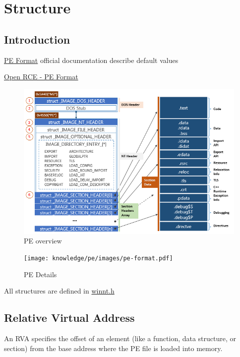 \section{Structure}
\subsection{Introduction}

\href{https://learn.microsoft.com/en-us/windows/win32/debug/pe-format}{PE Format} official documentation describe default values 

\href{https://www.openrce.org/reference_library/files/reference/PE%20Format.pdf}{Open RCE - PE Format}

\begin{figure}[!ht]
    \includegraphics[width=\linewidth]{knowledge/pe/images/Gen_DD_Win_PE_Format.png}
    \caption{PE overview}
    \label{fig:pe_overview}
\end{figure}

\begin{figure}[!ht]
    \texttt{[image: knowledge/pe/images/pe-format.pdf]}
    \caption{PE Details}
    \label{fig:pe_details}
\end{figure}

All structures are defined in \href{https://learn.microsoft.com/fr-fr/windows/win32/api/winnt/}{winnt.h}

\subsection{Relative Virtual Address}
An RVA specifies the offset of an element (like a function, data structure, or section) from the base address where the PE file is loaded into memory.

